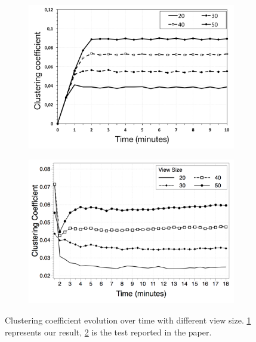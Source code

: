
\begin{figure}
\centering
\begin{subfigure}{.5\textwidth}
  \centering
  \includegraphics[keepaspectratio=true, width=1\linewidth]{images/clustering_coefficient_evolution}
  \caption{}
  \label{fig:clustering_coefficient_evolution}
\end{subfigure}%
\begin{subfigure}{.5\textwidth}
  \centering
  \includegraphics[keepaspectratio=true, width=1\linewidth]{images/paper_clustering_coefficient_evolution}
  \caption{}
  \label{fig:paper_clustering_coefficient_evolution}
\end{subfigure}
\caption{Clustering coefficient evolution over time with different view size. \ref{fig:clustering_coefficient_evolution} represents our result, \ref{fig:paper_clustering_coefficient_evolution} is the test reported in the paper.}
\label{fig:randomness_clustering}
\end{figure}

